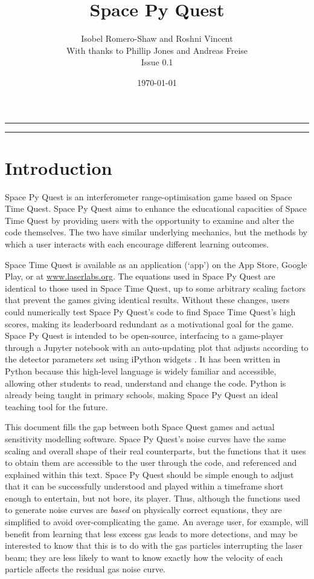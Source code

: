 \documentclass{article}
\title{Space Py Quest}
\author{Isobel Romero-Shaw and Roshni Vincent \\
{\small With thanks to Phillip Jones and Andreas Freise} \\
Issue 0.1}
\date{\today}
\begin{document}
\maketitle
\hrule
\tableofcontents
\hrule
\clearpage

\section{Introduction}
\label{sec:introduction}
Space Py Quest is an interferometer range-optimisation game based on
Space Time Quest. Space Py Quest aims to enhance the educational
capacities of Space Time Quest by providing users with the opportunity
to examine and alter the code themselves. The two have similar
underlying mechanics, but the methods by which a user interacts with
each encourage different learning outcomes. 

Space Time Quest is available as an application (`app') on the App
Store, Google Play, or at \url{www.laserlabs.org}. The equations used
in Space Py Quest are identical to those used in Space Time Quest, up
to some arbitrary scaling factors that prevent the games giving
identical results. Without these changes, users could numerically test
Space Py Quest's code to find Space Time Quest's high scores, making
its leaderboard redundant as a motivational goal for the
game. Space Py Quest is intended to be open-source, interfacing to a
game-player through a Jupyter notebook \cite{jupyter} with an
auto-updating plot that adjusts according to the detector parameters
set using iPython widgets \cite{ipy}. It has been written in Python
because this high-level language is widely familiar and accessible,
allowing other students to read, understand and change the
code. Python is already being taught in primary schools, making
Space Py Quest an ideal teaching tool for the future.

This document fills the gap between both Space Quest games and actual
sensitivity modelling software. Space Py Quest's noise curves have the
same scaling and overall shape of their real counterparts, but the
functions that it uses to obtain them are accessible to the user
through the code, and referenced and explained within this
text. Space Py Quest should be simple enough to adjust that it can be
successfully understood and played within a timeframe short enough to
entertain, but not bore, its player. Thus, although the functions used
to generate noise curves are \textit{based} on physically correct
equations, they are simplified to avoid over-complicating the game. An
average user, for example, will benefit from learning that less excess
gas leads to more detections, and may be interested to know that this
is to do with the gas particles interrupting the laser beam; they are
less likely to want to know exactly how the velocity of each particle
affects the  residual gas noise curve.
\end{document}
